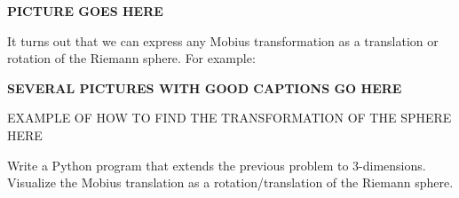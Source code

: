 {\bf PICTURE GOES HERE}

It turns out that we can express any Mobius transformation as a translation or rotation of the Riemann sphere.  For example:

{\bf SEVERAL PICTURES WITH GOOD CAPTIONS GO HERE}

EXAMPLE OF HOW TO FIND THE TRANSFORMATION OF THE SPHERE HERE

\begin{problem}  Write a Python program that extends the previous problem to 3-dimensions.  Visualize the Mobius translation as a rotation/translation of the Riemann sphere.
\end{problem}



